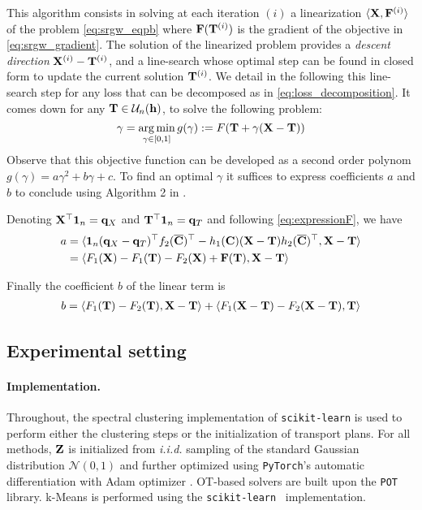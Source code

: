 This algorithm consists in solving at each
iteration $(i)$ a linearization $\langle {\mathbf{X}} , {\mathbf{F}}^{(i)} \rangle$ of the problem \eqref{eq:srgw_eqpb}
where ${\mathbf{F}}({\mathbf{T}}^{(i)})$ is the gradient of the objective in \eqref{eq:srgw_gradient}.  The solution of the linearized problem provides a \emph{descent direction} ${\mathbf{X}}^{(i) }-{\mathbf{T}}^{(i)}$, and a line-search whose optimal step can be found in closed form to
update the current solution ${\mathbf{T}}^{(i)}$. We detail in the following this line-search step for any loss that can be decomposed as in \eqref{eq:loss_decomposition}. It comes down for any ${\mathbf{T}} \in \mathcal{U}_n({\mathbf{h}})$, to solve the following problem:
\begin{equation}
\gamma = \operatorname*{arg\,min}_{\gamma \in [0,1]} g(\gamma) := F({\mathbf{T}} + \gamma ({\mathbf{X}} - {\mathbf{T}}))
\end{equation}
Observe that this objective function can be developed as a second order polynom $g(\gamma) = a \gamma^2 + b \gamma +c$. To find an optimal $\gamma$ it suffices to express coefficients $a$ and $b$ to conclude using Algorithm 2 in \citep{vayer2018optimal}.


Denoting ${\mathbf{X}}^\top \bm{1}_n = {\mathbf{q}}_X$ and ${\mathbf{T}}^\top \bm{1}_n = {\mathbf{q}}_T$ and following \eqref{eq:expressionF}, we have
\begin{equation}
\begin{split}
	a &= \langle  \bm{1}_{n} ({\mathbf{q}}_X - {\mathbf{q}}_T)^\top f_2(\overline{{\mathbf{C}}})^\top - h_1({\mathbf{C}}) ({\mathbf{X}}- {\mathbf{T}}) h_2(\overline{{\mathbf{C}}})^\top , {\mathbf{X}} - {\mathbf{T}} \rangle \\
	&= \langle F_1({\mathbf{X}}) - F_1({\mathbf{T}}) - F_2({\mathbf{X}}) + {\mathbf{F}}({\mathbf{T}}) , {\mathbf{X}} - {\mathbf{T}} \rangle 
\end{split}
\end{equation}

Finally the coefficient $b$ of the linear term is
\begin{equation}
\begin{split}
	b &=  \langle  F_1({\mathbf{T}}) - F_2({\mathbf{T}}) , {\mathbf{X}}-{\mathbf{T}} \rangle + \langle  F_1({\mathbf{X}} - {\mathbf{T}}) - F_2({\mathbf{X}}- {\mathbf{T}}), {\mathbf{T}}  \rangle \\
\end{split}
\end{equation}



\subsection{Experimental setting}\label{sec:implementation_details}

\paragraph{Implementation.} 
Throughout, the spectral clustering implementation of \texttt{scikit-learn} \citep{pedregosa2011scikit} is used to perform either the clustering steps or the initialization of transport plans. 
For all methods, ${\mathbf{Z}}$ is initialized from \emph{i.i.d.} sampling of the standard Gaussian distribution $\mathcal{N}(0,1)$ and further optimized using \texttt{PyTorch}'s automatic differentiation \citep{paszke2017automatic} with Adam optimizer \citep{kingma2014adam}. OT-based solvers are built upon the \texttt{POT} \citep{flamary2021pot} library.
k-Means is performed using the \texttt{scikit-learn}~\citep{pedregosa2011scikit} implementation.

